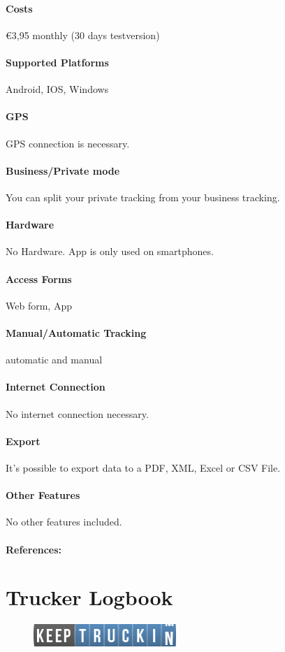 \paragraph{Costs} \euro 3,95 monthly (30 days testversion)
\paragraph{Supported Platforms} Android, IOS, Windows
\paragraph{GPS} GPS connection is necessary.
\paragraph{Business/Private mode} You can split your private tracking from your business tracking.
\paragraph{Hardware} No Hardware. App is only used on smartphones.
\paragraph{Access Forms} Web form, App
\paragraph{Manual/Automatic Tracking} automatic and manual
\paragraph{Internet Connection} No internet connection necessary.
\paragraph{Export} It’s possible to export data to a PDF, XML, Excel or CSV File.
\paragraph{Other Features} No other features included.
\paragraph{References:} \cite{Fahrtenbuch_Mileage_Book}
\newpage

\section{Trucker Logbook}
\begin{figure}
  \begin{center}
    \includegraphics[width=0.48\textwidth]{bilder/trucker}
  \end{center}
\end{figure}
